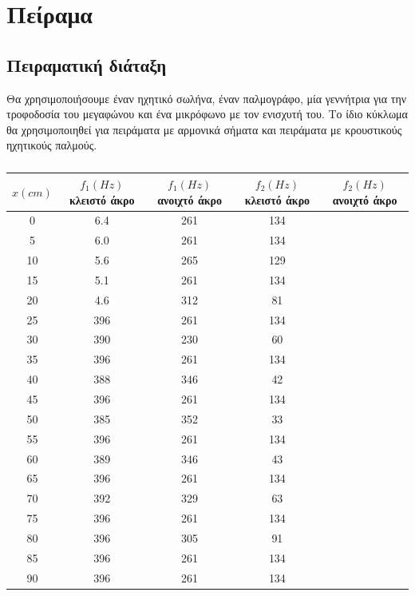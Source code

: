 \documentclass[a4paper,11pt,titlepage]{article}
\begin{document}
\section{Πείραμα}

\subsection{Πειραματική διάταξη}

Θα χρησιμοποιήσουμε έναν ηχητικό σωλήνα, έναν παλμογράφο, μία γεννήτρια για την τροφοδοσία του μεγαφώνου και ένα μικρόφωνο με τον ενισχυτή του. Το ίδιο κύκλωμα θα χρησιμοποιηθεί για πειράματα με αρμονικά σήματα και πειράματα με κρουστικούς ηχητικούς παλμούς.

\begin{table} [H]
\centering
\begin{tabular}{|c|c|c|c|c}
\hline \rule[-2ex]{0pt}{5.5ex} $x (cm)$ & $f_{1} (Hz)$ κλειστό άκρο & $f_{1} (Hz)$ ανοιχτό άκρο & $f_{2} (Hz)$ κλειστό άκρο & $f_{2} (Hz)$ ανοιχτό άκρο \\ 
\hline \rule[-2ex]{0pt}{5.5ex} 0 & 6.4 & 261 & 134 \\
\hline \rule[-2ex]{0pt}{5.5ex} 5 & 6.0 & 261 & 134 \\
\hline \rule[-2ex]{0pt}{5.5ex} 10 & 5.6 & 265 & 129 \\
\hline \rule[-2ex]{0pt}{5.5ex} 15 & 5.1 & 261 & 134 \\
\hline \rule[-2ex]{0pt}{5.5ex} 20 & 4.6 & 312 & 81 \\
\hline \rule[-2ex]{0pt}{5.5ex} 25 & 396 & 261 & 134 \\
\hline \rule[-2ex]{0pt}{5.5ex} 30 & 390 & 230 & 60 \\
\hline \rule[-2ex]{0pt}{5.5ex} 35 & 396 & 261 & 134 \\
\hline \rule[-2ex]{0pt}{5.5ex} 40 & 388 & 346 & 42 \\
\hline \rule[-2ex]{0pt}{5.5ex} 45 & 396 & 261 & 134 \\
\hline \rule[-2ex]{0pt}{5.5ex} 50 & 385 & 352 & 33 \\
\hline \rule[-2ex]{0pt}{5.5ex} 55 & 396 & 261 & 134 \\
\hline \rule[-2ex]{0pt}{5.5ex} 60 & 389 & 346 & 43 \\
\hline \rule[-2ex]{0pt}{5.5ex} 65 & 396 & 261 & 134 \\
\hline \rule[-2ex]{0pt}{5.5ex} 70 & 392 & 329 & 63\\
\hline \rule[-2ex]{0pt}{5.5ex} 75 & 396 & 261 & 134 \\
\hline \rule[-2ex]{0pt}{5.5ex} 80 & 396 & 305 & 91 \\
\hline \rule[-2ex]{0pt}{5.5ex} 85 & 396 & 261 & 134 \\
\hline \rule[-2ex]{0pt}{5.5ex} 90 & 396 & 261 & 134 \\
\hline 
\end{tabular} 
\caption{}
\end{table}
\end{document}
